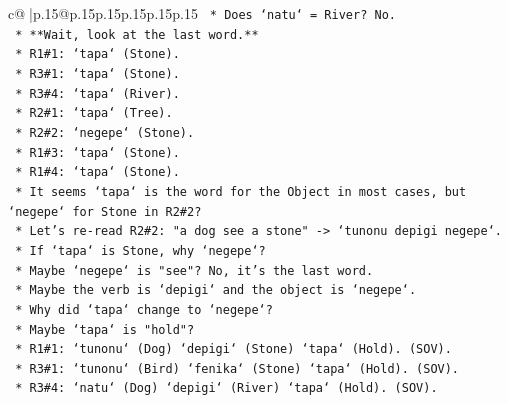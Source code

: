 \documentclass{article}
\begin{document}
{\begin{supertabular}{c@{$\;$}|p{.15\linewidth}@{}p{.15\linewidth}p{.15\linewidth}p{.15\linewidth}p{.15\linewidth}p{.15\linewidth}}
{{{\texttt{                                        *   Does `natu` = River? No.} \\
\texttt{                                    *   **Wait, look at the last word.**} \\
\texttt{                                        *   R1\#1: `tapa` (Stone).} \\
\texttt{                                        *   R3\#1: `tapa` (Stone).} \\
\texttt{                                        *   R3\#4: `tapa` (River).} \\
\texttt{                                        *   R2\#1: `tapa` (Tree).} \\
\texttt{                                        *   R2\#2: `negepe` (Stone).} \\
\texttt{                                        *   R1\#3: `tapa` (Stone).} \\
\texttt{                                        *   R1\#4: `tapa` (Stone).} \\
\texttt{                                        *   It seems `tapa` is the word for the Object in most cases, but `negepe` for Stone in R2\#2?} \\
\texttt{                                        *   Let's re{-}read R2\#2: "a dog see a stone" {-}> `tunonu depigi negepe`.} \\
\texttt{                                            *   If `tapa` is Stone, why `negepe`?} \\
\texttt{                                            *   Maybe `negepe` is "see"? No, it's the last word.} \\
\texttt{                                            *   Maybe the verb is `depigi` and the object is `negepe`.} \\
\texttt{                                            *   Why did `tapa` change to `negepe`?} \\
\texttt{                                            *   Maybe `tapa` is "hold"?} \\
\texttt{                                                *   R1\#1: `tunonu` (Dog) `depigi` (Stone) `tapa` (Hold). (SOV).} \\
\texttt{                                                *   R3\#1: `tunonu` (Bird) `fenika` (Stone) `tapa` (Hold). (SOV).} \\
\texttt{                                                *   R3\#4: `natu` (Dog) `depigi` (River) `tapa` (Hold). (SOV).} \\
}}}
\end{supertabular}}
\end{document}

